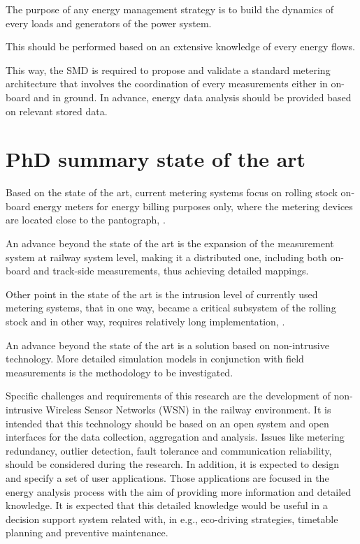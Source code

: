 The purpose of any energy management strategy is to build the dynamics of every loads and generators of the power system. 

This should be performed based on an extensive knowledge of every energy flows. 

This way, the SMD is required to propose and validate a standard metering architecture that involves the coordination of every measurements either in on-board and in ground. 
In advance, energy data analysis should be provided based on relevant stored data. 

\section{PhD summary state of the art}

Based on the state of the art, current metering systems focus on rolling stock on-board energy meters for energy billing purposes only, where the metering devices are located close to the pantograph, \cite{shift2rail2015}.

An advance beyond the state of the art is the expansion of the measurement system at railway system level, making it a distributed one, including both on-board and track-side measurements, thus achieving detailed mappings. 

\vspace{2em}

Other point in the state of the art is the intrusion level of currently used metering systems, that in one way, became a critical subsystem of the rolling stock and in other way, requires relatively long implementation, \cite{shift2rail2015}. 

An advance beyond the state of the art is a solution based on non-intrusive technology. More detailed simulation models in conjunction with field measurements is the methodology to be investigated.




Specific challenges and requirements of this research are the development of non-intrusive Wireless Sensor Networks (WSN)  in the railway environment. 
It is intended that this technology should be based on an open system and open interfaces for the data collection, aggregation and analysis. 
Issues like metering redundancy, outlier detection, fault tolerance and communication reliability, should be considered during the research.
In addition, it is expected to design and specify a set of user applications.
Those applications are focused in the energy analysis process with the aim of providing more information and detailed knowledge.
It is expected that this detailed knowledge would be useful in a decision support system related with, in e.g., eco-driving strategies, timetable planning and preventive maintenance.



